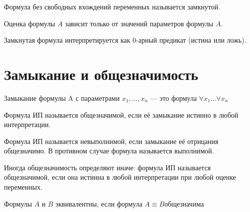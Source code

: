 \documentclass[11pt]{article}
\begin{document}
\begin{definition}
    Формула без свободных вхождений переменных называется замкнутой.
\end{definition}

\begin{remark}
    Оценка формулы $A$ зависит только от значений параметров формулы $A$.
\end{remark}

\begin{remark}    
    Замкнутая формула интерпретируется как 0-арный предикат (истина или ложь).
\end{remark}

\section{Замыкание и общезначимость}

\begin{definition}
    Замыкание формулы A с параметрами $x_1, \dots, x_n$ --- это формула $\forall x_1 
    \dots \forall x_n$
\end{definition}

\begin{definition}
    Формула ИП называется общезначимой, если её замыкание истинно в любой
    интерпретации.
\end{definition}

\begin{definition}
    Формула ИП называется невыполнимой, если замыкание её отрицания общезначимо. 
    В противном случае формула называется выполнимой.
\end{definition}

\begin{remark}
    Иногда общезначимость определяют иначе: формула ИП называется общезначимой, 
    если она истинна в любой интерпретации при любой оценке переменных.
\end{remark}

\begin{definition}
    Формулы $A$ и $B$ эквивалентны, если формула $A \equiv B$общезначима
\end{definition}
\end{document}
